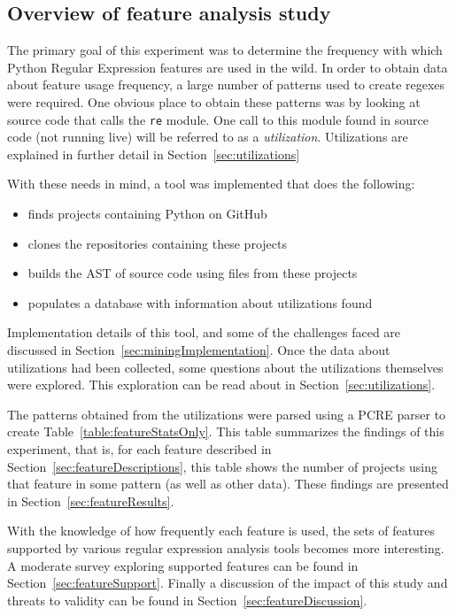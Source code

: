 \subsection{Overview of feature analysis study}

The primary goal of this experiment was to determine the frequency with which Python Regular Expression features are used in the wild.  In order to obtain data about feature usage frequency, a large number of patterns used to create regexes were required.  One obvious place to obtain these patterns was by looking at source code that calls the {\tt re} module.  One call to this module found in source code (not running live) will be referred to as a \emph{utilization}.  Utilizations are explained in further detail in Section~\ref{sec:utilizations}

With these needs in mind, a tool was implemented that does the following:
\begin{itemize} \itemsep -1pt
\item finds projects containing Python on GitHub
\item clones the repositories containing these projects
\item builds the AST of source code using files from these projects
\item populates a database with information about utilizations found
\end{itemize}

Implementation details of this tool, and some of the challenges faced are discussed in Section~\ref{sec:miningImplementation}.  Once the data about utilizations had been collected, some questions about the utilizations themselves were explored.  This exploration can be read about in Section~\ref{sec:utilizations}.

The patterns obtained from the utilizations were parsed using a PCRE parser to create Table~\ref{table:featureStatsOnly}.  This table summarizes the findings of this experiment, that is, for each feature described in Section~\ref{sec:featureDescriptions}, this table shows the number of projects using that feature in some pattern (as well as other data).  These findings are presented in Section~\ref{sec:featureResults}.

With the knowledge of how frequently each feature is used, the sets of features supported by various regular expression analysis tools becomes more interesting.  A moderate survey exploring supported features can be found in Section~\ref{sec:featureSupport}.  Finally a discussion of the impact of this study and threats to validity can be found in Section~\ref{sec:featureDiscussion}.
